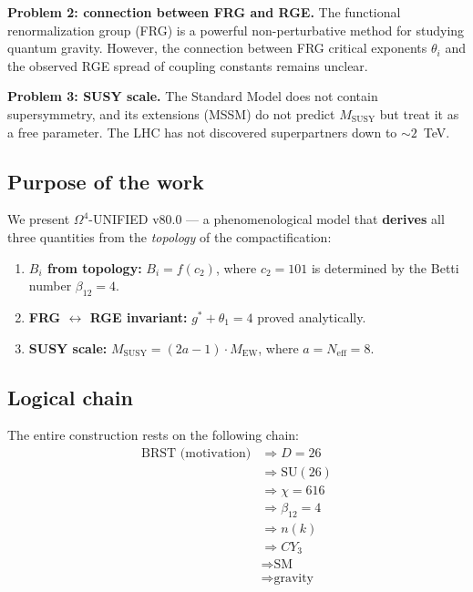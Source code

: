 \documentclass[11pt,a4paper]{article}
\newcommand{\SU}{\ensuremath{\mathrm{SU}}}
\newcommand{\CY}{\ensuremath{CY_3}}
\newcommand{\Om}{\ensuremath{\Omega^4}}
\newcommand{\gstar}{\ensuremath{g^*}}
\newcommand{\Neff}{\ensuremath{N_{\text{eff}}}}
\newcommand{\MEW}{\ensuremath{M_{\text{EW}}}}
\newcommand{\MSUSY}{\ensuremath{M_{\text{SUSY}}}}
\newcommand{\cTwo}{\ensuremath{c_2}}
\theoremstyle{definition}
\begin{document}
\medskip\noindent
\textbf{Problem 2: connection between FRG and RGE.}
The functional renormalization group (FRG) is a powerful non-perturbative
method for studying quantum gravity. However, the connection between
FRG critical exponents $\theta_i$ and the observed RGE spread of
coupling constants remains unclear.

\medskip\noindent
\textbf{Problem 3: SUSY scale.}
The Standard Model does not contain supersymmetry, and its extensions
(MSSM) do not predict $\MSUSY$ but treat it as a
free parameter. The LHC has not discovered superpartners down to $\sim 2$~TeV.

\subsection{Purpose of the work}

We present $\Om$-UNIFIED v80.0 --- a phenomenological model
that \textbf{derives} all three quantities from the \emph{topology}
of the compactification:

\begin{enumerate}
    \item \textbf{$B_i$ from topology:} $B_i = f(\cTwo)$, where
          $\cTwo = 101$ is determined by the Betti number $\beta_{12} = 4$.
    \item \textbf{FRG $\leftrightarrow$ RGE invariant:}
          $\gstar + \theta_1 = 4$ proved analytically.
    \item \textbf{SUSY scale:} $\MSUSY = (2a-1) \cdot \MEW$,
          where $a = \Neff = 8$.
\end{enumerate}

\subsection{Logical chain}

The entire construction rests on the following chain:
\begin{equation}
    \boxed{
    \begin{aligned}
        \text{BRST (motivation)} &\Rightarrow D = 26 \\
        &\Rightarrow \SU(26) \\
        &\Rightarrow \chi = 616 \\
        &\Rightarrow \beta_{12} = 4 \\
        &\Rightarrow n(k) \\
        &\Rightarrow \CY \\
        &\Rightarrow \text{SM} \\
        &\Rightarrow \text{gravity}
    \end{aligned}}
    \label{eq:logic-chain}
\end{equation}
\end{document}
